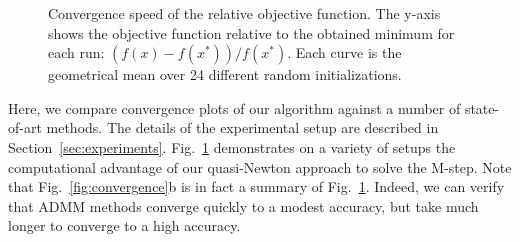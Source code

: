 \begin{appendices}
\begin{figure}[htb]
    \centering
    \vspace{-5pt}
    \caption{Convergence speed of the relative objective function. The y-axis shows the objective function relative to the obtained minimum for each run: $(f(x) - f(x^*))/f(x^*)$. Each curve is the geometrical mean over 24 different random initializations.}
    \label{fig:convergence_setups}
\end{figure}

Here, we compare convergence plots of our algorithm against a number of state-of-art methods. The details of the experimental setup are described in Section~\ref{sec:experiments}. Fig.~\ref{fig:convergence_setups} demonstrates on a variety of setups the computational
advantage of our quasi-Newton approach to solve the M-step.
Note that Fig.~\ref{fig:convergence}b is in fact a summary of Fig.~\ref{fig:convergence_setups}. 
Indeed, we can verify that ADMM methods converge quickly to a modest accuracy, but take much longer to converge to a high accuracy.\citep{boyd2011distributed}


\end{appendices}
